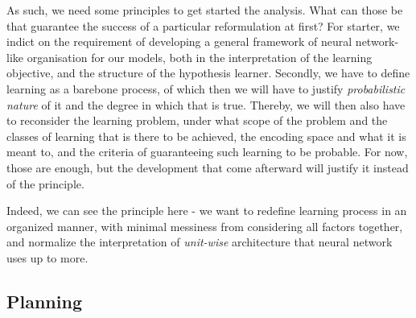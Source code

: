 As such, we need some principles to get started the analysis. What can those be that guarantee the success of a particular reformulation at first? For starter, we indict on the requirement of developing a general framework of neural network-like organisation for our models, both in the interpretation of the learning objective, and the structure of the hypothesis learner. Secondly, we have to define learning as a barebone process, of which then we will have to justify \textit{probabilistic nature} of it and the degree in which that is true. Thereby, we will then also have to reconsider the learning problem, under what scope of the problem and the classes of learning that is there to be achieved, the encoding space and what it is meant to, and the criteria of guaranteeing such learning to be probable. For now, those are enough, but the development that come afterward will justify it instead of the principle. 

Indeed, we can see the principle here - we want to redefine learning process in an organized manner, with minimal messiness from considering all factors together, and normalize the interpretation of \textit{unit-wise} architecture that neural network uses up to more. 

\subsection{Planning}

